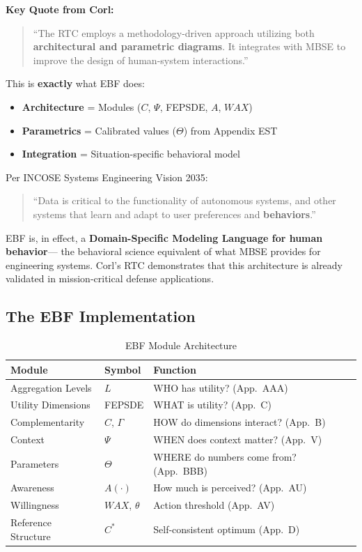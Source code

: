 \textbf{Key Quote from Corl:}
\begin{quote}
``The RTC employs a methodology-driven approach utilizing both \textbf{architectural
and parametric diagrams}. It integrates with MBSE to improve the design of
human-system interactions.''
\end{quote}

This is \textbf{exactly} what EBF does:
\begin{itemize}[nosep]
    \item \textbf{Architecture} = Modules ($C$, $\Psi$, FEPSDE, $A$, $WAX$)
    \item \textbf{Parametrics} = Calibrated values ($\Theta$) from Appendix EST
    \item \textbf{Integration} = Situation-specific behavioral model
\end{itemize}

Per INCOSE Systems Engineering Vision 2035:
\begin{quote}
``Data is critical to the functionality of autonomous systems, and other systems that
learn and adapt to user preferences and \textbf{behaviors}.''
\end{quote}

EBF is, in effect, a \textbf{Domain-Specific Modeling Language for human behavior}---
the behavioral science equivalent of what MBSE provides for engineering systems.
Corl's RTC demonstrates that this architecture is already validated in
mission-critical defense applications.

\subsection{The EBF Implementation}

\begin{table}[htbp]
\centering
\caption{EBF Module Architecture}
\label{tab:ebf-modules}
\renewcommand{\arraystretch}{1.3}
\begin{tabular}{@{}llp{6cm}@{}}
\toprule
\textbf{Module} & \textbf{Symbol} & \textbf{Function} \\
\midrule
Aggregation Levels & $L$ & WHO has utility? (App.\ AAA) \\
Utility Dimensions & FEPSDE & WHAT is utility? (App.\ C) \\
Complementarity & $C$, $\Gamma$ & HOW do dimensions interact? (App.\ B) \\
Context & $\Psi$ & WHEN does context matter? (App.\ V) \\
Parameters & $\Theta$ & WHERE do numbers come from? (App.\ BBB) \\
Awareness & $A(\cdot)$ & How much is perceived? (App.\ AU) \\
Willingness & $WAX$, $\theta$ & Action threshold (App.\ AV) \\
Reference Structure & $C^*$ & Self-consistent optimum (App.\ D) \\
\bottomrule
\end{tabular}
\end{table}

